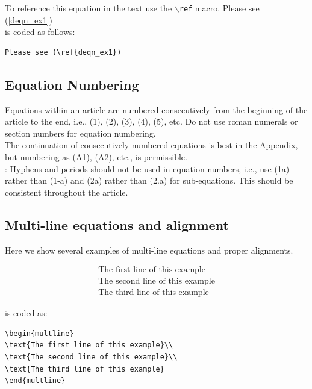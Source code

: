\documentclass[lettersize,journal]{IEEEtran}
\begin{document}
To reference this equation in the text use the $\backslash${\tt{ref}} macro. 
Please see (\ref{deqn_ex1})\\
\noindent is coded as follows:
\begin{verbatim}
Please see (\ref{deqn_ex1})\end{verbatim}

\subsection{Equation Numbering}
 Equations within an article are numbered consecutively from the beginning of the
article to the end, i.e., (1), (2), (3), (4), (5), etc. Do not use roman numerals or section numbers for equation numbering.\\

 The continuation of consecutively numbered equations is best in the Appendix, but numbering
 as (A1), (A2), etc., is permissible.\\

: Hyphens and periods should not be used in equation numbers, i.e., use (1a) rather than
(1-a) and (2a) rather than (2.a) for sub-equations. This should be consistent throughout the article.

\subsection{Multi-line equations and alignment}
\noindent Here we show several examples of multi-line equations and proper alignments.

\begin{multline}
\text{The first line of this example}\\
\text{The second line of this example}\\
\text{The third line of this example}
\end{multline}

\noindent is coded as:
\begin{verbatim}
\begin{multline}
\text{The first line of this example}\\
\text{The second line of this example}\\
\text{The third line of this example}
\end{multline}
\end{verbatim}
\end{document}
